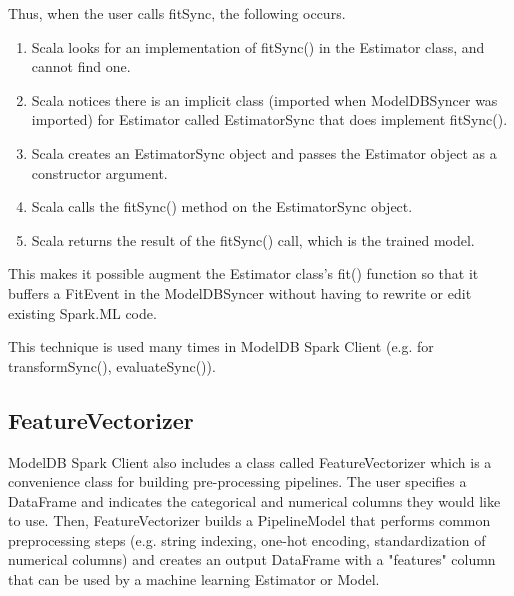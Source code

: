Thus, when the user calls fitSync, the following occurs.

\begin{enumerate}
\item Scala looks for an implementation of fitSync() in the Estimator class, and cannot find one.
\item Scala notices there is an implicit class (imported when ModelDBSyncer was imported) 
for Estimator called EstimatorSync that does implement fitSync().
\item Scala creates an EstimatorSync object and passes the Estimator object as a constructor argument.
\item Scala calls the fitSync() method on the EstimatorSync object.
\item Scala returns the result of the fitSync() call, which is the trained model.
\end{enumerate}

This makes it possible augment the Estimator class's fit() function so that it 
buffers a FitEvent in the ModelDBSyncer without having to rewrite or edit existing Spark.ML code.

This technique is used many times in ModelDB Spark Client (e.g. for transformSync(), evaluateSync()).

\subsection{FeatureVectorizer}

ModelDB Spark Client also includes a class called FeatureVectorizer which is a convenience class
for building pre-processing pipelines. The user specifies a DataFrame and indicates the categorical and numerical columns
they would like to use. Then, FeatureVectorizer builds a PipelineModel that performs common preprocessing steps (e.g. string indexing,
one-hot encoding, standardization of numerical columns) and creates an output DataFrame with a "features" column that can
be used by a machine learning Estimator or Model.

